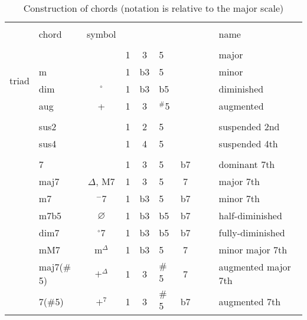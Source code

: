 \usepackage{arydshln}


\begin{table*}[!h]
	\centering
	\caption{Construction of chords (notation is relative to the major scale)}
	\begin{tabular}{clccclcccl}
		\hline \vspace{-0.2cm} \\
		 & chord & symbol & & & & & & & name \\
		\hline \vspace{-0.2cm} \\
		\multirow{4}{*}{triad} &         & & 1 & 3 & 5           & & & & major\\
		                       & m       & & 1 & b3 & 5           & & & & minor\\
		                       & dim     & $^\circ$ & 1 & b3 & b5     & & & & diminished\\
		                       & aug     & + & 1 & 3 & $^\#$5 & & & & augmented \\
		\hline  \vspace{-0.2cm} \\
		\multirow{4}{*}{ }    & sus2     & & 1 & 2  & 5   &   &   & & suspended 2nd \\
		                       & sus4    & & 1 & 4   & 5   &   &   & & suspended 4th \\
		\hline \vspace{-0.2cm} \\
		\multirow{8}{*}{tetrad}& 7       &               & 1 & 3  & 5 & b7                & & & dominant 7th \\
		                       & maj7   & $\Delta$, M$7$      & 1 & 3  & 5 & 7  & & & major 7th\\
		                       & m7     & $^{-}$7        & 1 & b3  & 5 & b7  & & & minor 7th\\
		                       & m7b5   & $\varnothing$            & 1 & b3  & b5 & b7 & & & half-diminished \\
		                       & dim7   & $^{\circ}$7        & 1 & b3  & b5 & b7  & & & fully-diminished\\
        					   & mM7    & m$^\Delta$          & 1 & b3  & 5 & 7   & & & minor major 7th \\
							   & maj7($\#$5) & $+^{\Delta}$    & 1 & 3  & $\#$5 & 7  & & & augmented major 7th \\
		                       & 7($\#$5)    & $+^{7}$    & 1 & 3  & $\#$5 & b7  & & & augmented 7th \\

\end{tabular}
\end{table*}
